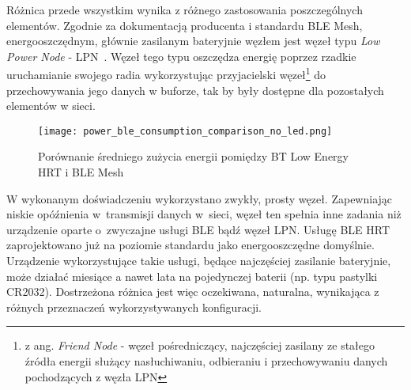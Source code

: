 Różnica przede wszystkim wynika z różnego zastosowania poszczególnych elementów. Zgodnie za dokumentacją producenta i standardu BLE Mesh,
energooszczędnym, głównie zasilanym bateryjnie węzłem jest węzeł typu \textit{Low Power Node} - LPN~\cite{st_an5292_2021}\cite{wooley_martin_bluetooth_2019}. Węzeł tego typu oszczędza energię poprzez rzadkie uruchamianie swojego radia
wykorzystując przyjacielski węzeł\footnote{z ang. \textit{Friend Node} - węzeł pośredniczący, najczęściej zasilany ze stałego 
źródła energii służący nasłuchiwaniu, odbieraniu i przechowywaniu danych pochodzących z węzła LPN} 
do przechowywania jego danych w buforze, tak by były dostępne dla pozostałych elementów w sieci.

\begin{figure}[!ht]
	\centering \texttt{[image: power\_ble\_consumption\_comparison\_no\_led.png]} 
	\caption{Porównanie średniego zużycia energii pomiędzy BT Low Energy HRT i BLE Mesh}
	\label{rys:power_ble_consumption_comparison}
\end{figure}

W wykonanym doświadczeniu wykorzystano zwykły, prosty węzeł. Zapewniając niskie opóźnienia w~transmisji danych w~sieci, węzeł ten
spełnia inne zadania niż urządzenie oparte o~zwyczajne usługi BLE bądź węzeł LPN. Usługę BLE HRT zaprojektowano już na poziomie standardu
jako energooszczędne domyślnie. Urządzenie wykorzystujące takie usługi, będące najczęściej zasilanie bateryjnie, może działać
miesiące a nawet lata na pojedynczej baterii (np. typu pastylki CR2032). Dostrzeżona różnica jest więc oczekiwana, naturalna, wynikająca
z różnych przeznaczeń wykorzystywanych konfiguracji.
